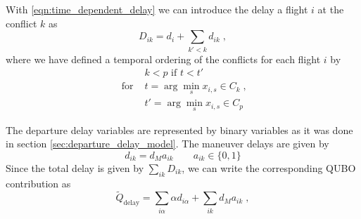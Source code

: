 \documentclass[aps,pra,twocolumn,10pt]{revtex4-1}
\begin{document}
With \eqref{eqn:time_dependent_delay} we can introduce the delay a flight $i$ at the conflict $k$ as
\begin{equation} \label{eqn:maneuver_model_delay_at_conflict}
    D_{ik} = d_i + \sum_{k'<k} d_{ik} \; ,
\end{equation}
where we have defined a temporal ordering of the conflicts for each flight $i$ by
\begin{align*}
                 &k < p \text{ if } t < t' \\
    \text{ for } &t = \arg \min_s x_{i, s} \in C_k \; , \\
                 &t' = \arg \min_s x_{i, s} \in C_p
\end{align*}

The departure delay variables are represented by binary variables as it was done in section \ref{sec:departure_delay_model}.
The maneuver delays are given by
\begin{equation*}
    d_{ik} = d_M a_{ik} \qquad a_{ik} \in \{0, 1\}
\end{equation*}
Since the total delay is given by $\sum_{ik} D_{ik}$, we can write the corresponding QUBO contribution as
\begin{equation*}
    \tilde Q_\text{delay} = \sum_{i\alpha} \alpha d_{i\alpha}  + \sum_{ik} d_M a_{ik}\; ,
\end{equation*}
\end{document}
